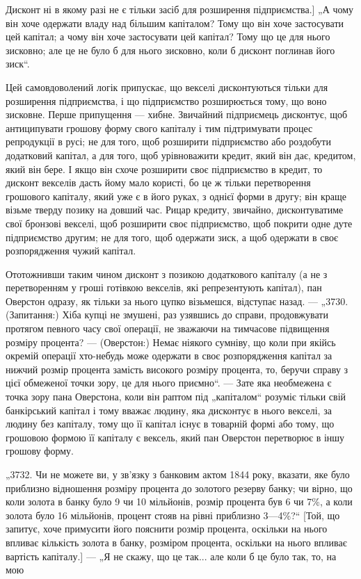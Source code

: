 \parcont{}  %
Дисконт ні в якому разі не є тільки засіб для розширення підприємства.] „А чому він хоче одержати
владу над більшим капіталом? Тому що він хоче застосувати цей капітал; а чому він
хоче застосувати цей капітал? Тому що це для нього зисковно;
але це не було б для нього зисковно, коли б дисконт поглинав
його зиск“.

Цей самовдоволений логік припускає, що векселі дисконтуються тільки для розширення підприємства, і
що підприємство
розширюється тому, що воно зисковне. Перше припущення — хибне. Звичайний підприємець дисконтує, щоб
антиципувати грошову форму свого капіталу і тим підтримувати процес репродукції в русі; не для того,
щоб розширити підприємство або роздобути додатковий капітал, а для того, щоб урівноважити кредит,
який він дає, кредитом, який він бере. І якщо він схоче
розширити своє підприємство в кредит, то дисконт векселів
дасть йому мало користі, бо це ж тільки перетворення грошового капіталу, який уже є в його руках, з
однієї форми
в другу; він краще візьме тверду позику на довший час.
Рицар кредиту, звичайно, дисконтуватиме свої бронзові векселі,
щоб розширити своє підприємство, щоб покрити одне дуте підприємство другим; не для того, щоб
одержати зиск, а щоб одержати в своє розпорядження чужий капітал.

Ототожнивши таким чином дисконт з позикою додаткового
капіталу (а не з перетворенням у гроші готівкою векселів, які
репрезентують капітал), пан Оверстон одразу, як тільки за нього
цупко візьмешся, відступає назад. — „3730. (Запитання:) Хіба
купці не змушені, раз узявшись до справи, продовжувати протягом певного часу свої операції, не
зважаючи на тимчасове
підвищення розміру процента? — (Оверстон:) Немає ніякого
сумніву, що коли при якійсь окремій операції хто-небудь може
одержати в своє розпорядження капітал за нижчий розмір
процента замість високого розміру процента, то, беручи справу
з цієї обмеженої точки зору, це для нього приємно“. — Зате
яка необмежена є точка зору пана Оверстона, коли він раптом
під „капіталом“ розуміє тільки свій банкірський капітал і тому
вважає людину, яка дисконтує в нього векселі, за людину без
капіталу, тому що її капітал існує в товарній формі або тому,
що грошовою формою її капіталу є вексель, який пан Оверстон
перетворює в іншу грошову форму.

„3732. Чи не можете ви, у зв’язку з банковим актом 1844 року,
вказати, яке було приблизно відношення розміру процента до
золотого резерву банку; чи вірно, що коли золота в банку було
9 чи 10 мільйонів, розмір процента був 6 чи 7\%, а коли золота
було 16 мільйонів, процент стояв на рівні приблизно 3—4\%?“
[Той, що запитує, хоче примусити його пояснити розмір процента, оскільки на нього впливає кількість
золота в банку, розміром процента, оскільки на нього впливає вартість капіталу.] —
„Я не скажу, що це так... але коли б це було так, то, на мою
\parbreak{}  %
